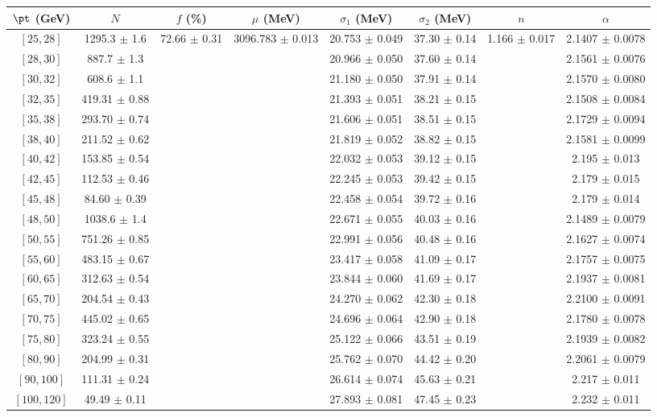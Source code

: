 \begin{tabular}{c||c|c|c|c|c|c|c}
$\pt$ (GeV) & $N$ & $f$ (\%) & $\mu$ (MeV) & $\sigma_1$ (MeV) & $\sigma_2$ (MeV) & $n$ & $\alpha$ \\
\hline
$[25, 28]$ & 1295.3 $\pm$ 1.6 & \multirow{19}{*}{72.66 $\pm$ 0.31} & \multirow{19}{*}{3096.783 $\pm$ 0.013} & 20.753 $\pm$ 0.049 & 37.30 $\pm$ 0.14 & \multirow{19}{*}{1.166 $\pm$ 0.017} & 2.1407 $\pm$ 0.0078\\
$[28, 30]$ & 887.7 $\pm$ 1.3 &  &  & 20.966 $\pm$ 0.050 & 37.60 $\pm$ 0.14 &  & 2.1561 $\pm$ 0.0076\\
$[30, 32]$ & 608.6 $\pm$ 1.1 &  &  & 21.180 $\pm$ 0.050 & 37.91 $\pm$ 0.14 &  & 2.1570 $\pm$ 0.0080\\
$[32, 35]$ & 419.31 $\pm$ 0.88 &  &  & 21.393 $\pm$ 0.051 & 38.21 $\pm$ 0.15 &  & 2.1508 $\pm$ 0.0084\\
$[35, 38]$ & 293.70 $\pm$ 0.74 &  &  & 21.606 $\pm$ 0.051 & 38.51 $\pm$ 0.15 &  & 2.1729 $\pm$ 0.0094\\
$[38, 40]$ & 211.52 $\pm$ 0.62 &  &  & 21.819 $\pm$ 0.052 & 38.82 $\pm$ 0.15 &  & 2.1581 $\pm$ 0.0099\\
$[40, 42]$ & 153.85 $\pm$ 0.54 &  &  & 22.032 $\pm$ 0.053 & 39.12 $\pm$ 0.15 &  & 2.195 $\pm$ 0.013\\
$[42, 45]$ & 112.53 $\pm$ 0.46 &  &  & 22.245 $\pm$ 0.053 & 39.42 $\pm$ 0.15 &  & 2.179 $\pm$ 0.015\\
$[45, 48]$ & 84.60 $\pm$ 0.39 &  &  & 22.458 $\pm$ 0.054 & 39.72 $\pm$ 0.16 &  & 2.179 $\pm$ 0.014\\
$[48, 50]$ & 1038.6 $\pm$ 1.4 &  &  & 22.671 $\pm$ 0.055 & 40.03 $\pm$ 0.16 &  & 2.1489 $\pm$ 0.0079\\
$[50, 55]$ & 751.26 $\pm$ 0.85 &  &  & 22.991 $\pm$ 0.056 & 40.48 $\pm$ 0.16 &  & 2.1627 $\pm$ 0.0074\\
$[55, 60]$ & 483.15 $\pm$ 0.67 &  &  & 23.417 $\pm$ 0.058 & 41.09 $\pm$ 0.17 &  & 2.1757 $\pm$ 0.0075\\
$[60, 65]$ & 312.63 $\pm$ 0.54 &  &  & 23.844 $\pm$ 0.060 & 41.69 $\pm$ 0.17 &  & 2.1937 $\pm$ 0.0081\\
$[65, 70]$ & 204.54 $\pm$ 0.43 &  &  & 24.270 $\pm$ 0.062 & 42.30 $\pm$ 0.18 &  & 2.2100 $\pm$ 0.0091\\
$[70, 75]$ & 445.02 $\pm$ 0.65 &  &  & 24.696 $\pm$ 0.064 & 42.90 $\pm$ 0.18 &  & 2.1780 $\pm$ 0.0078\\
$[75, 80]$ & 323.24 $\pm$ 0.55 &  &  & 25.122 $\pm$ 0.066 & 43.51 $\pm$ 0.19 &  & 2.1939 $\pm$ 0.0082\\
$[80, 90]$ & 204.99 $\pm$ 0.31 &  &  & 25.762 $\pm$ 0.070 & 44.42 $\pm$ 0.20 &  & 2.2061 $\pm$ 0.0079\\
$[90, 100]$ & 111.31 $\pm$ 0.24 &  &  & 26.614 $\pm$ 0.074 & 45.63 $\pm$ 0.21 &  & 2.217 $\pm$ 0.011\\
$[100, 120]$ & 49.49 $\pm$ 0.11 &  &  & 27.893 $\pm$ 0.081 & 47.45 $\pm$ 0.23 &  & 2.232 $\pm$ 0.011\\
\end{tabular}
